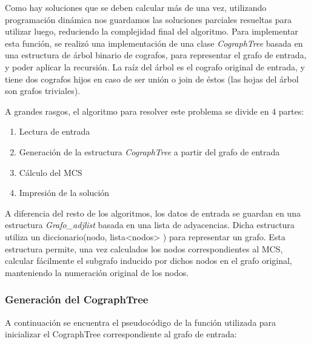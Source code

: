 Como hay soluciones que se deben calcular más de una vez, utilizando programación dinámica nos guardamos las soluciones parciales resueltas para utilizar luego, reduciendo la complejidad final del algoritmo. Para implementar esta función, se realizó una implementación de una clase \emph{CographTree} basada en una estructura de árbol binario de cografos, para representar el grafo de entrada, y poder aplicar la recursión. La raíz del árbol es el cografo original de entrada, y tiene dos cografos hijos en caso de ser unión o join de éstos (las hojas del árbol son grafos triviales). 

A grandes rasgos, el algoritmo para resolver este problema se divide en 4 partes:
\begin{enumerate}
\item Lectura de entrada
\item Generación de la estructura \emph{CographTree} a partir del grafo de entrada
\item Cálculo del MCS
\item Impresión de la solución 
\end{enumerate}

A diferencia del resto de los algoritmos, los datos de entrada se guardan en una estructura \emph{Grafo\_adjlist} basada en una lista de adyacencias. Dicha estructura utiliza un diccionario(nodo, lista<nodos> ) para representar un grafo. Esta estructura permite, una vez calculados los nodos correspondientes al MCS, calcular fácilmente el subgrafo inducido por dichos nodos en el grafo original, manteniendo la numeración original de los nodos.

\subsubsection{Generación del CographTree}

A continuación se encuentra el pseudocódigo de la función utilizada para inicializar el CographTree correspondiente al grafo de entrada:

